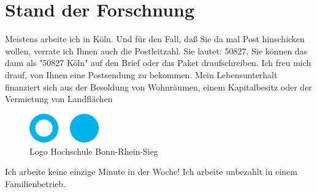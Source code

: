 \section{Stand der Forschnung}
Meistens arbeite ich in Köln. Und für den Fall, daß Sie da mal Post hinschicken wollen, verrate ich Ihnen auch die Postleitzahl. Sie lautet: 50827. Sie können das dann als "50827 Köln" auf den Brief oder das Paket draufschreiben. Ich freu mich drauf, von Ihnen eine Postsendung zu bekommen.
Mein Lebensunterhalt finanziert sich aus der Besoldung von Wohnräumen, einem Kapitalbesitz oder der Vermietung von Landflächen

\begin{figure}[!ht]
  \begin{center}
    \includegraphics[width=3cm]{images/fhlogo.pdf}
    \caption{Logo Hochschule Bonn-Rhein-Sieg}
    \label{an_tranciver}
  \end{center}
\end{figure}

Ich arbeite keine einzige Minute in der Woche! 
Ich arbeite unbezahlt in einem Familienbetrieb.